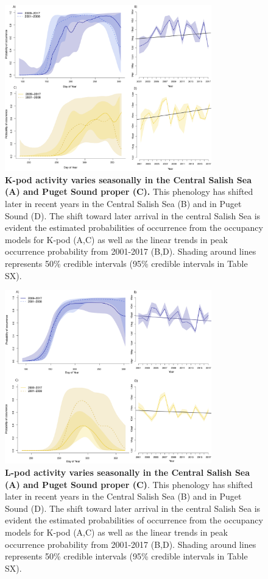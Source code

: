 \documentclass{article}
\begin{document}
\begin{figure}[p]
\includegraphics[width=0.8\textwidth]{../analyses/figures/proboccK_4panels.png} 
\caption{\textbf{K-pod activity varies seasonally in the Central Salish Sea (A) and Puget Sound proper (C).} This phenology has shifted later in recent years in the Central Salish Sea (B) and in Puget Sound (D). The shift toward later arrival in the central Salish Sea is evident the estimated probabilities of occurrence from the occupancy models for K-pod (A,C) as well as the linear trends in peak occurrence probability from 2001-2017 (B,D). Shading around lines represents 50\% credible intervals (95\% credible intervals in Table SX). 
}
\label{fig:Kprobs}
\end{figure}


\begin{figure}[p]
\includegraphics[width=0.8\textwidth]{../analyses/figures/proboccL_4panels.png} 
\caption{\textbf{L-pod activity varies seasonally in the Central Salish Sea (A) and Puget Sound proper (C)}. This phenology has shifted later in recent years in the Central Salish Sea (B) and in Puget Sound (D). The shift toward later arrival in the central Salish Sea is evident the estimated probabilities of occurrence from the occupancy models for K-pod (A,C) as well as the linear trends in peak occurrence probability from 2001-2017 (B,D). Shading around lines represents 50\% credible intervals (95\% credible intervals in Table SX). 
}
\label{fig:Lprobs}
\end{figure}

  
\end{document}
